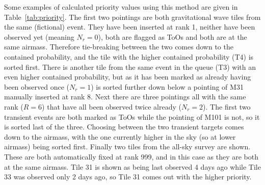 \begin{colsection}
\begin{colsection}
Some examples of calculated priority values using this method are given in Table~\ref{tab:priority}. The first two pointings are both gravitational wave tiles from the same (fictional) event. They have been inserted at rank 1, neither have been observed yet (meaning $N_r=0$), both are flagged as ToOs and both are at the same airmass. Therefore tie-breaking between the two comes down to the contained probability, and the tile with the higher contained probability (T4) is sorted first. There is another tile from the same event in the queue (T3) with an even higher contained probability, but as it has been marked as already having been observed once ($N_r=1$) is sorted further down below a pointing of M31 manually inserted at rank 8. Next there are three pointings all with the same rank ($R=6$) that have all been observed twice already ($N_r=2$). The first two transient events are both marked as ToOs while the pointing of M101 is not, so it is sorted last of the three. Choosing between the two transient targets comes down to the airmass, with the one currently higher in the sky (so at lower airmass) being sorted first. Finally two tiles from the all-sky survey are shown. These are both automatically fixed at rank 999, and in this case as they are both at the same airmass. Tile 31 is shown as being last observed 4 days ago while Tile 33 was observed only 2 days ago, so Tile 31 comes out with the higher priority.


\end{colsection}
\end{colsection}

